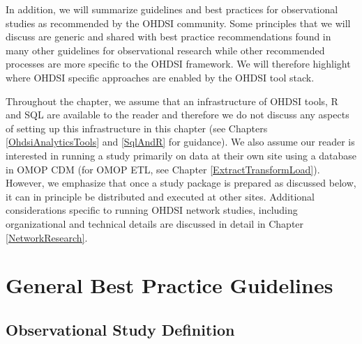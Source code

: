 \documentclass[11pt]{book}
\theoremstyle{definition}
\theoremstyle{definition}
\theoremstyle{definition}
\theoremstyle{remark}
\begin{document}
In addition, we will summarize guidelines and best practices for observational studies as recommended by the OHDSI community. Some principles that we will discuss are generic and shared with best practice recommendations found in many other guidelines for observational research while other recommended processes are more specific to the OHDSI framework. We will therefore highlight where OHDSI specific approaches are enabled by the OHDSI tool stack.

Throughout the chapter, we assume that an infrastructure of OHDSI tools, R and SQL are available to the reader and therefore we do not discuss any aspects of setting up this infrastructure in this chapter (see Chapters \ref{OhdsiAnalyticsTools} and \ref{SqlAndR} for guidance). We also assume our reader is interested in running a study primarily on data at their own site using a database in OMOP CDM (for OMOP ETL, see Chapter \ref{ExtractTransformLoad}). However, we emphasize that once a study package is prepared as discussed below, it can in principle be distributed and executed at other sites. Additional considerations specific to running OHDSI network studies, including organizational and technical details are discussed in detail in Chapter \ref{NetworkResearch}.

\hypertarget{general-best-practice-guidelines}{%
\section{General Best Practice Guidelines}\label{general-best-practice-guidelines}}

\hypertarget{observational-study-definition}{%
\subsection{Observational Study Definition}\label{observational-study-definition}}
\end{document}
